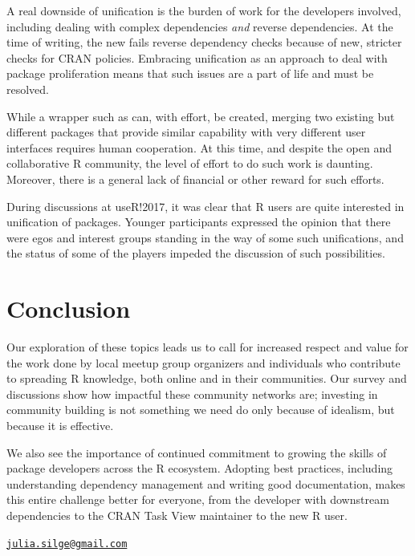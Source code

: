 A real downside of unification is the burden of work for the developers
involved, including dealing with complex dependencies \emph{and} reverse
dependencies. At the time of writing, the new  fails
reverse dependency checks because of new, stricter checks for CRAN
policies. Embracing unification as an approach to deal with package
proliferation means that such issues are a part of life and must be
resolved.

While a wrapper such as  can, with effort, be created,
merging two existing but different packages that provide similar
capability with very different user interfaces requires human
cooperation. At this time, and despite the open and collaborative R
community, the level of effort to do such work is daunting. Moreover,
there is a general lack of financial or other reward for such efforts.

During discussions at useR!2017, it was clear that R users are quite
interested in unification of packages. Younger participants expressed
the opinion that there were egos and interest groups standing in the way
of some such unifications, and the status of some of the players impeded
the discussion of such possibilities.

\hypertarget{conclusion}{%
\section{Conclusion}\label{conclusion}}

Our exploration of these topics leads us to call for increased respect
and value for the work done by local meetup group organizers and
individuals who contribute to spreading R knowledge, both online and in
their communities. Our survey and discussions show how impactful these
community networks are; investing in community building is not something
we need do only because of idealism, but because it is effective.

We also see the importance of continued commitment to growing the skills
of package developers across the R ecosystem. Adopting best practices,
including understanding dependency management and writing good
documentation, makes this entire challenge better for everyone, from the
developer with downstream dependencies to the CRAN Task View maintainer
to the new R user.




\address{%
Julia Silge\\
Stack Overflow\\
110 William Street, Floor 28\\ New York City, NY 10038\\
}
\href{mailto:julia.silge@gmail.com}{\nolinkurl{julia.silge@gmail.com}}


